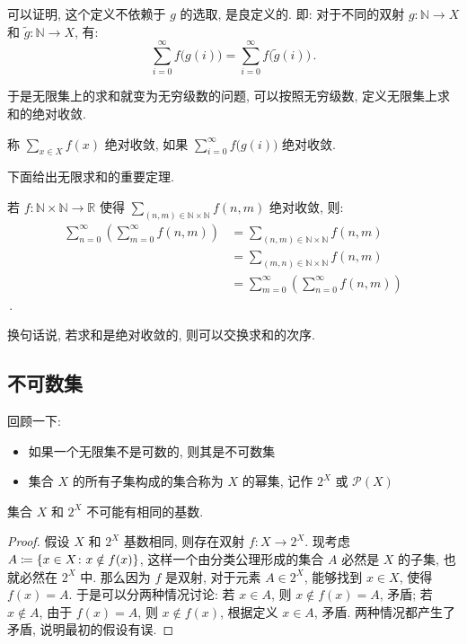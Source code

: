 \documentclass[UTF8]{ctexart}
\theoremstyle{mystyle}
\theoremstyle{myremark}
\theoremstyle{plain}
\renewcommand{\cal}{\mathcal}
\newcommand{\R}{\mathbb R}
\newcommand{\N}{\mathbb N}
\DeclarePairedDelimiter\set{\{}{\}}
\begin{document}
可以证明, 这个定义不依赖于 $ g $ 的选取, 是良定义的. 即: 对于不同的双射 $ g \colon \N \to X $ 和 $ \widetilde{g} \colon \N \to X $, 有: \[ \sum_{i = 0}^\infty f \big( g(i) \big) = \sum_{i = 0}^\infty f \big( \widetilde{g}(i) \big) \,.\]

于是无限集上的求和就变为无穷级数的问题, 可以按照无穷级数, 定义无限集上求和的绝对收敛.

\begin{definition}
    称 $ \sum\limits_{x \in X} f(x) $ 绝对收敛, 如果 $ \sum\limits_{i = 0}^\infty f \big( g(i) \big) $ 绝对收敛.
\end{definition}

下面给出无限求和的重要定理.

\begin{theorem}
    若 $ f \colon \N \times \N \to \R $ 使得 $ \displaystyle \sum_{(n, m) \in \N \times \N} f(n, m) $ 绝对收敛, 则:
    \begin{align*}
        \sum_{n = 0}^\infty \left( \sum_{m = 0}^{\infty} f(n, m) \right) &= \sum_{(n, m) \in \N \times \N} f(n, m) \\
        &= \sum_{(m, n) \in \N \times \N} f(n, m) \\
        &= \sum_{m = 0}^\infty \left( \sum_{n = 0}^{\infty} f(n, m) \right)
    \end{align*}\,.
\end{theorem}

换句话说, 若求和是绝对收敛的, 则可以交换求和的次序.


\subsection{不可数集}
回顾一下:
\begin{itemize}
    \item 如果一个无限集不是可数的, 则其是不可数集
    \item 集合 $ X $ 的所有子集构成的集合称为 $ X $ 的幂集, 记作 $ 2^X $ 或 $ \cal P(X) $
\end{itemize}

\begin{theorem}
    集合 $ X $ 和 $ 2^X $ 不可能有相同的基数.
\end{theorem}

\begin{proof}
    假设 $ X $ 和 $ 2^X $ 基数相同, 则存在双射 $ f \colon X \to 2^X $. 现考虑 $ A \coloneqq \set{x \in X \colon x \notin f(x)} $, 这样一个由分类公理形成的集合 $ A $ 必然是 $ X $ 的子集, 也就必然在 $ 2^X $ 中. 那么因为 $ f $ 是双射, 对于元素 $ A \in 2^X $, 能够找到 $ x \in X $, 使得 $ f(x) = A $. 于是可以分两种情况讨论: 若 $ x \in A $, 则 $ x \notin f(x) = A $, 矛盾; 若 $ x \notin A $, 由于 $ f(x) = A $, 则 $ x \notin f(x) $, 根据定义 $ x \in A $, 矛盾. 两种情况都产生了矛盾, 说明最初的假设有误.
\end{proof}
\end{document}
